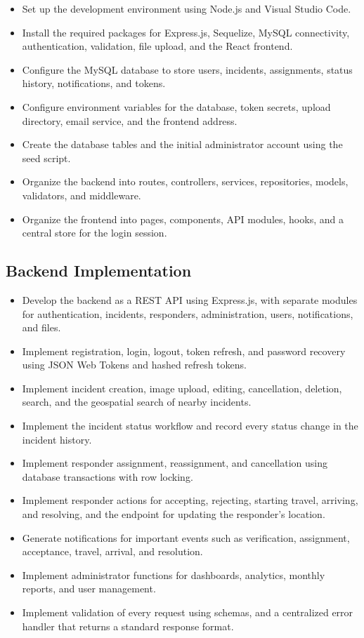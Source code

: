 \documentclass[a4paper,12pt]{report}
\begin{document}
	\begin{itemize}
		\item Set up the development environment using Node.js and Visual Studio Code.
		\item Install the required packages for Express.js, Sequelize, MySQL connectivity, authentication, validation, file upload, and the React frontend.
		\item Configure the MySQL database to store users, incidents, assignments, status history, notifications, and tokens.
		\item Configure environment variables for the database, token secrets, upload directory, email service, and the frontend address.
		\item Create the database tables and the initial administrator account using the seed script.
		\item Organize the backend into routes, controllers, services, repositories, models, validators, and middleware.
		\item Organize the frontend into pages, components, API modules, hooks, and a central store for the login session.
	\end{itemize}
	
	\subsection{Backend Implementation}
	
	\begin{itemize}
		\item Develop the backend as a REST API using Express.js, with separate modules for authentication, incidents, responders, administration, users, notifications, and files.
		\item Implement registration, login, logout, token refresh, and password recovery using JSON Web Tokens and hashed refresh tokens.
		\item Implement incident creation, image upload, editing, cancellation, deletion, search, and the geospatial search of nearby incidents.
		\item Implement the incident status workflow and record every status change in the incident history.
		\item Implement responder assignment, reassignment, and cancellation using database transactions with row locking.
		\item Implement responder actions for accepting, rejecting, starting travel, arriving, and resolving, and the endpoint for updating the responder's location.
		\item Generate notifications for important events such as verification, assignment, acceptance, travel, arrival, and resolution.
		\item Implement administrator functions for dashboards, analytics, monthly reports, and user management.
		\item Implement validation of every request using schemas, and a centralized error handler that returns a standard response format.
	\end{itemize}
	
\end{document}
